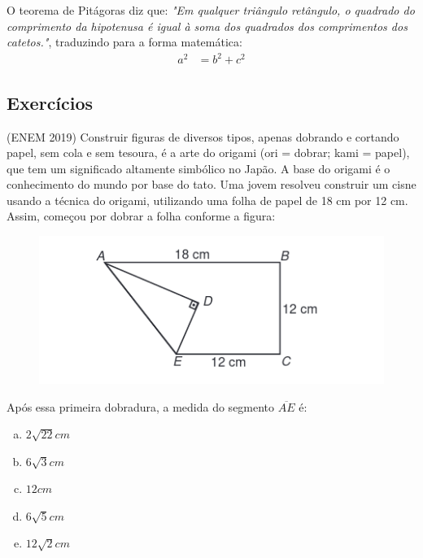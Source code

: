 \begin{multicols*}{2}
    O teorema de Pitágoras diz que: \textit{"Em qualquer triângulo retângulo, o quadrado do comprimento da hipotenusa é 
    igual à soma dos quadrados dos comprimentos dos catetos."}, traduzindo para 
    a forma matemática: 
    \begin{align}
        a^2 &= b^2 + c^2
    \end{align}



    \subsection{Exercícios}

    \noindent
    \execnum (ENEM 2019) Construir figuras de diversos tipos, apenas dobrando e cortando papel, 
    sem cola e sem tesoura, é a arte do origami (ori = dobrar; kami = papel), 
    que tem um significado altamente simbólico no Japão. A base do origami é o 
    conhecimento do mundo por base do tato. Uma jovem resolveu construir um
    cisne usando a técnica do origami, utilizando uma folha de papel de 18 cm 
    por 12 cm. Assim, começou por dobrar a folha conforme a figura:

    \begin{figure}[H]
        \includegraphics[width=\columnwidth]{assets/enem2019-171.png}
    \end{figure}

    \noindent 
    Após  essa  primeira  dobradura,  a  medida  do  segmento $\overline{AE}$ é:
    \begin{enumerate}[a)]
        \item $2\sqrt{22}cm$
        \item $6\sqrt{3}cm$
        \item $12cm$
        \item $6\sqrt{5}cm$
        \item $12\sqrt{2}cm$
    \end{enumerate}


\end{multicols*}
